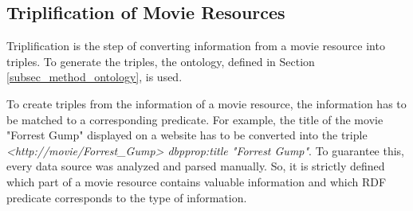 \subsection{Triplification of Movie Resources}
\label{subsec_method_triplification}

Triplification is the step of converting information from a movie resource into triples.
To generate the triples, the ontology, defined in Section \ref{subsec_method_ontology}, is used.

To create triples from the information of a movie resource, the information has to be matched to a corresponding predicate.
For example, the title of the movie "Forrest Gump" displayed on a website has to be converted into the triple \emph{<http://movie/Forrest\_Gump> dbpprop:title "Forrest Gump"}.
To guarantee this, every data source was analyzed and parsed manually.
So, it is strictly defined which part of a movie resource contains valuable information and which RDF predicate corresponds to the type of information.